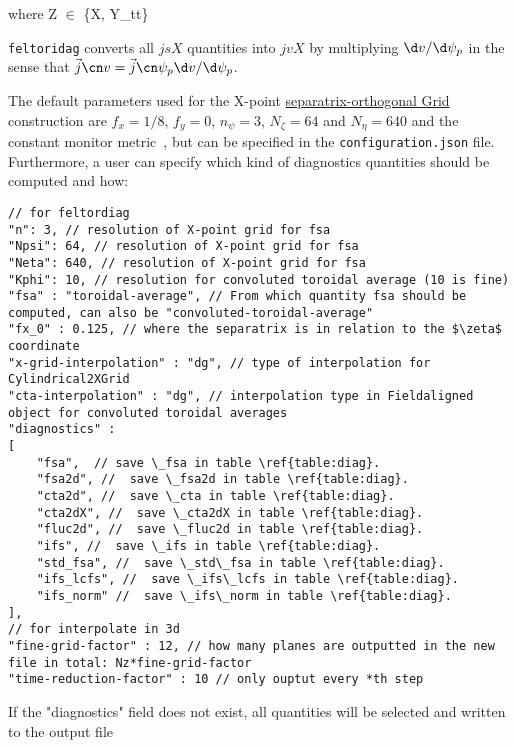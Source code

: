 where Z $\in$ \{X, Y\_tt\}
\begin{tcolorbox}[title=Note]
    \texttt{feltoridag} converts all $jsX$ quantities into $jvX$
by multiplying $\d v/\d \psi_p$
in the sense that $\vec j\cn v  = \vec j \cn \psi_p \d v/\d\psi_p$.
\end{tcolorbox}
The default parameters used for the X-point
\href{https://feltor-dev.github.io/doc/geometries/html/structdg_1_1geo_1_1_separatrix_orthogonal.html}{separatrix-orthogonal Grid}
construction are $f_x = 1/8$, $f_y = 0$, $n_\psi = 3$, $N_\zeta = 64$ and
$N_\eta = 640$ and the constant monitor metric~\cite{Wiesenberger2018}, but can be specified in the \texttt{configuration.json} file.
Furthermore, a user can specify which kind of diagnostics quantities should be computed and how:
\begin{verbatim}
// for feltordiag
"n": 3, // resolution of X-point grid for fsa
"Npsi": 64, // resolution of X-point grid for fsa
"Neta": 640, // resolution of X-point grid for fsa
"Kphi": 10, // resolution for convoluted toroidal average (10 is fine)
"fsa" : "toroidal-average", // From which quantity fsa should be computed, can also be "convoluted-toroidal-average"
"fx_0" : 0.125, // where the separatrix is in relation to the $\zeta$ coordinate
"x-grid-interpolation" : "dg", // type of interpolation for Cylindrical2XGrid
"cta-interpolation" : "dg", // interpolation type in Fieldaligned object for convoluted toroidal averages
"diagnostics" :
[
    "fsa",  // save \_fsa in table \ref{table:diag}.
    "fsa2d", //  save \_fsa2d in table \ref{table:diag}.
    "cta2d", //  save \_cta in table \ref{table:diag}.
    "cta2dX", //  save \_cta2dX in table \ref{table:diag}.
    "fluc2d", //  save \_fluc2d in table \ref{table:diag}.
    "ifs", //  save \_ifs in table \ref{table:diag}.
    "std_fsa", //  save \_std\_fsa in table \ref{table:diag}.
    "ifs_lcfs", //  save \_ifs\_lcfs in table \ref{table:diag}.
    "ifs_norm" //  save \_ifs\_norm in table \ref{table:diag}.
],
// for interpolate in 3d
"fine-grid-factor" : 12, // how many planes are outputted in the new file in total: Nz*fine-grid-factor
"time-reduction-factor" : 10 // only ouptut every *th step
\end{verbatim}
\begin{tcolorbox}[title=Note]
    If the "diagnostics" field does not exist, all quantities will be selected and written to the output file
\end{tcolorbox}


